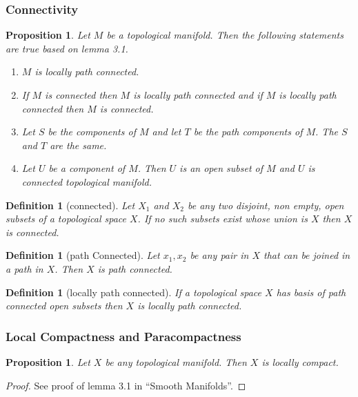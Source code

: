 \documentclass{article}
\newtheorem{proposition}[theorem]{Proposition}
\newtheorem{definition}[theorem]{Definition}
\begin{document}
\subsubsection{Connectivity}
\begin{proposition}
  Let $ M $ be a topological manifold.  Then the following statements are true based on lemma 3.1.
  \begin{enumerate}
  \item $ M $ is locally path connected.
  \item If $ M $ is connected then $ M $ is locally path connected and if $ M $ is locally path connected then $ M $ is connected.
  \item Let $ S $ be the components of $ M $ and let $ T $ be the path components of $ M $. The $ S $ and $ T $ are the same.
  \item Let $ U $ be a component of $ M $. Then $ U $ is an open subset of $ M $ and $ U $ is connected topological manifold.
  \end{enumerate}
\end{proposition}

\begin{definition}[connected]
Let $ X_{1} $ and $  X_{2} $ be any two disjoint, non empty,  open subsets of a topological space $ X $. If no such subsets exist whose union is $ X $ then $ X $ is connected.
\end{definition}
\begin{definition}[path Connected]
  Let $ x_{1}, x_{2} $ be any pair in $ X $ that can be joined in a path in $ X $. Then $ X $ is path connected.
\end{definition}
\begin{definition}[locally path connected]
  If a topological space $ X $ has basis of path connected open subsets then $ X $ is locally path connected.
\end{definition}

\subsubsection{Local Compactness and Paracompactness}
\begin{proposition}
  Let $ X $ be any topological manifold. Then $ X $ is locally compact.
\end{proposition}

\begin{proof}
  See proof of lemma 3.1 in ``Smooth Manifolds''.
\end{proof}
\end{document}
